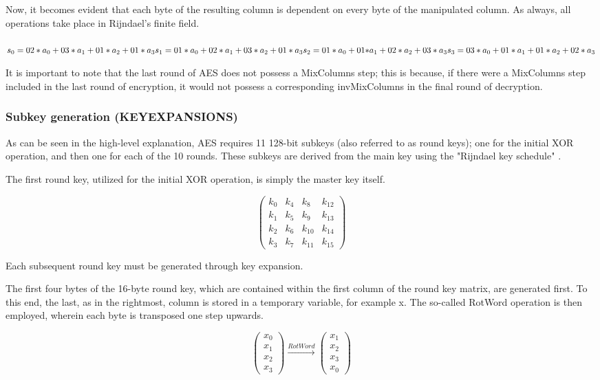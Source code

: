 \documentclass[12pt]{report}
\begin{document}
Now, it becomes evident that each byte of the resulting column is dependent on every byte of the manipulated column. As always, all operations take place in Rijndael's finite field. \\
\\
$
s_0 = {02}*a_0+{03}*a_1+{01}*a_2+{01}*a_3 \\
s_1 = {01}*a_0+{02}*a_1+{03}*a_2+{01}*a_3 \\
s_2 = {01}*a_0+{01*}a_1+{02}*a_2+{03}*a_3 \\
s_3 = {03}*a_0+{01}*a_1+{01}*a_2+{02}*a_3 \\ $

It is important to note that the last round of AES does not possess a MixColumns step; this is because, if there were a MixColumns step included in the last round of encryption, it would not possess a corresponding invMixColumns in the final round of decryption\cite{NoMixColumns}.
\subsubsection{Subkey generation (KEYEXPANSIONS)}
As can be seen in the high-level explanation, AES requires 11 128-bit subkeys (also referred to as round keys); one for the initial XOR operation, and then one for each of the 10 rounds. These subkeys are derived from the main key using the "Rijndael key schedule" \cite{KeySchedule}.


The first round key, utilized for the initial XOR operation, is simply the master key itself.

\[ \left( \begin{array}{cccc}
k_0 & k_4 & k_8 & k_{12} \\
k_1 & k_5 & k_9 & k_{13} \\
k_2 & k_6 & k_{10} & k_{14} \\
k_3 & k_7 & k_{11} & k_{15}\end{array} \right)\] 

Each subsequent round key must be generated through key expansion.

The first four bytes of the 16-byte round key, which are contained within the first column of the round key matrix, are generated first. To this end, the last, as in the rightmost, column is stored in a temporary variable, for example x. The so-called RotWord operation is then employed, wherein each byte is transposed one step upwards.

\[
\left( \begin{array}{c}
x_0 \\
x_1 \\
x_2 \\
x_3\end{array} \right)
\xrightarrow{RotWord}
\left( \begin{array}{c}
x_1 \\
x_2 \\
x_3 \\
x_0\end{array} \right)
\]
\end{document}
